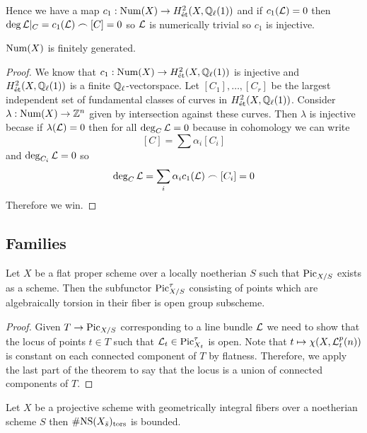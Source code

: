 \documentclass[12pt]{article}
\begin{document}
Hence we have a map $c_1 : \mathrm{Num}(X) \to H^2_{\text{\'{e}t}}(X, \mathbb{Q}_\ell(1))$ and if $c_1(\mathcal{L}) = 0$ then $\deg{\mathcal{L}|_C} = c_1(\mathcal{L}) \frown [C] = 0$ so $\mathcal{L}$ is numerically trivial so $c_1$ is injective. 

\begin{theorem}
$\mathrm{Num}(X)$ is finitely generated.
\end{theorem}

\begin{proof}
We know that $c_1 : \mathrm{Num}(X) \to H^2_{\text{\'{e}t}}(X, \mathbb{Q}_\ell(1))$ is injective and $H^2_{\text{\'{e}t}}(X, \mathbb{Q}_\ell(1))$ is a finite $\mathbb{Q}_\ell$-vectorspace. Let $[C_1], \dots, [C_r]$ be the largest independent set of fundamental classes of curves in $H^2_{\text{\'{e}t}}(X, \mathbb{Q}_\ell(1))$. Consider $\lambda : \mathrm{Num}(X) \to \mathbb{Z}^n$ given by intersection against these curves. Then $\lambda$ is injective becase if $\lambda(\mathcal{L}) = 0$ then for all $\deg_C \mathcal{L} = 0$ because in cohomology we can write
\[ [C] = \sum \alpha_i [C_i] \]
and $\deg_{C_i} \mathcal{L} = 0$ so 
\[ \deg_C \mathcal{L} = \sum_i \alpha_i c_1(\mathcal{L}) \frown [C_i] = 0 \]
Therefore we win. 
\end{proof}

\subsection{Families}

\renewcommand{\NS}{\mathrm{NS}}

\begin{prop}
Let $X$ be a flat proper scheme over a locally noetherian $S$ such that $\mathrm{Pic}_{X/S}$ exists as a scheme. Then the subfunctor $\mathrm{Pic}_{X/S}^{\tau}$ consisting of points which are algebraically torsion in their fiber is open group subscheme. 
\end{prop}

\begin{proof}
Given $T \to \mathrm{Pic}_{X/S}$ corresponding to a line bundle $\mathcal{L}$ we need to show that the locus of points $t \in T$ such that $\mathcal{L}_t \in \mathrm{Pic}_{X_t}^{\tau}$ is open. Note that $t \mapsto \chi(X, \mathcal{L}^p_t(n))$ is constant on each connected component of $T$ by flatness. Therefore, we apply the last part of the theorem to say that the locus is a union of connected components of $T$. 
\end{proof}

\begin{prop}
Let $X$ be a projective scheme with geometrically integral fibers over a noetherian scheme $S$ then $\# \NS(X_{\bar{s}})_{\tors}$ is bounded. 
\end{prop}
\end{document}
